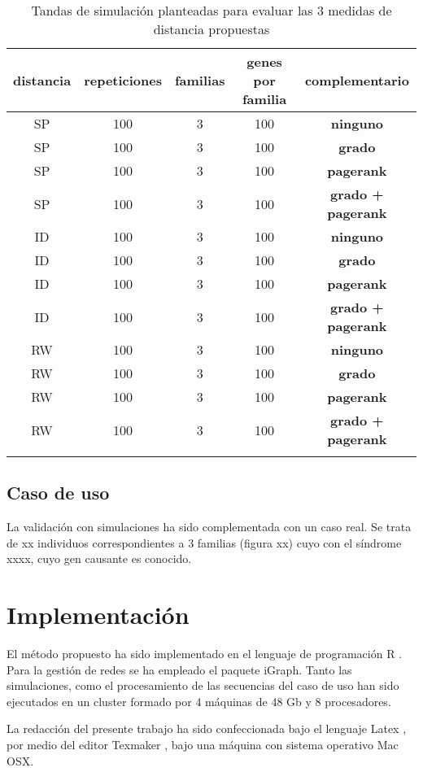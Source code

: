 \bigskip
\begin{small}
\begin{center}
\begin{table}[H]
\begin{tabular}{ccccc}
\textbf{distancia} & \textbf{repeticiones} & \textbf{familias} & \textbf{genes por familia} & \textbf{complementario} \tabularnewline 
\hline
\hline
\addlinespace[0.2cm]
SP	 & 100 & 3 & 100 & \textbf{ninguno} \tabularnewline 
SP	 & 100 & 3 & 100 & \textbf{grado} \tabularnewline
SP	 & 100 & 3 & 100 & \textbf{pagerank} \tabularnewline
SP	 & 100 & 3 & 100 & \textbf{grado + pagerank} \tabularnewline
\addlinespace[0.2cm]
\hline
\addlinespace[0.2cm]
ID	 & 100 & 3 & 100 & \textbf{ninguno} \tabularnewline 
ID	 & 100 & 3 & 100 & \textbf{grado} \tabularnewline
ID & 100 & 3 & 100 & \textbf{pagerank} \tabularnewline
ID	 & 100 & 3 & 100 & \textbf{grado + pagerank} \tabularnewline
\addlinespace[0.2cm]
\hline
\addlinespace[0.2cm]
RW & 100 & 3 & 100 & \textbf{ninguno} \tabularnewline 
RW & 100 & 3 & 100 & \textbf{grado} \tabularnewline
RW & 100 & 3 & 100 & \textbf{pagerank} \tabularnewline
RW & 100 & 3 & 100 & \textbf{grado + pagerank} \tabularnewline
\addlinespace[0.2cm]
\hline
\end{tabular}
\caption{Tandas de simulación planteadas para evaluar las 3 medidas de distancia propuestas}
\label{tab:tabla_otras}
\end{table}
\end{center}
\end{small}
\bigskip

	\subsection{Caso de uso}
	
La validación con simulaciones ha sido complementada con un caso real. Se trata de xx individuos correspondientes a 3 familias (figura xx) cuyo con el síndrome xxxx, cuyo gen causante es conocido.



\section{Implementación}

El método propuesto ha sido implementado en el lenguaje de programación R \cite{R}. Para la gestión de redes se ha empleado el paquete iGraph. Tanto las simulaciones, como el procesamiento de las secuencias del caso de uso han sido ejecutados en un cluster formado por 4 máquinas de 48 Gb y 8 procesadores. 

\medskip
La redacción del presente trabajo ha sido confeccionada bajo el lenguaje Latex \cite{latex-project,latex-book}, por medio del editor Texmaker \cite{texmaker}, bajo una máquina con sistema operativo Mac OSX.


